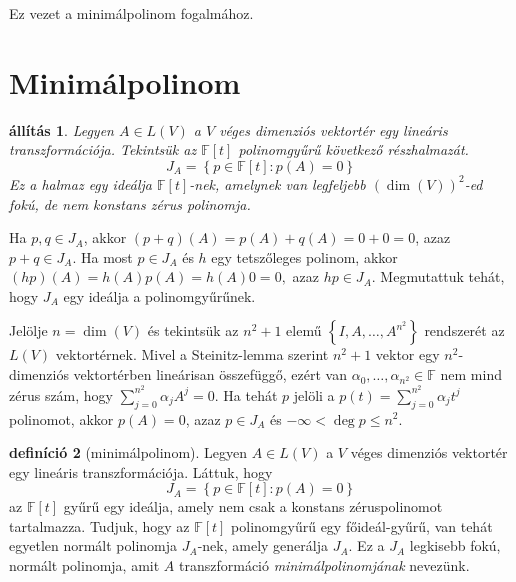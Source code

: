 \documentclass[a4paper, showtrims]{memoir}
\makeatletter
\renewenvironment{proof}[1][\proofname]
    {\par\pushQED{\qed}%
    \normalfont \topsep6\p@\@plus6\p@\relax
    \trivlist
    \item[\hskip\labelsep
        \itshape
    #1\@addpunct{:}]\ignorespaces}
    {\popQED\endtrivlist\@endpefalse}
\theoremstyle{plain}
\newtheorem{proposition}{állítás}[chapter]
\theoremstyle{remark}
\theoremstyle{definition}
\newtheorem{definition}[proposition]{definíció}
\makeatother
\begin{document}
Ez vezet a minimálpolinom fogalmához.

\section{Minimálpolinom}
\begin{proposition}
	Legyen $A\in L\left( V \right)$ a $V$ véges dimenziós vektortér egy lineáris transzformációja.
	Tekintsük az
	$\mathbb{F}\left[ t \right]$ polinomgyűrű következő részhalmazát.
	\[
		J_{A}
		=
		\left\{ p\in\mathbb{F}\left[ t \right]:p\left( A \right)=0 \right\}
	\]
	Ez a halmaz egy ideálja $\mathbb{F}\left[ t \right]$-nek,
	amelynek van legfeljebb $\left( \dim(V) \right)^2$-ed fokú,
	de nem konstans zérus polinomja.
\end{proposition}
\begin{proof}
	Ha $p,q\in J_{A}$,
	akkor
	$\left( p+q \right)(A)=p\left( A \right)+q\left( A \right)=0+0=0$,
	azaz $p+q\in J_{A}$.
	Ha most $p\in J_{A}$ és $h$ egy tetszőleges polinom,
	akkor
	$
		\left( hp \right)(A)=h\left( A \right)p\left( A \right)=h\left( A \right)0=0,
	$
	azaz $hp\in J_{A}$.
	Megmutattuk tehát, hogy $J_{A}$ egy ideálja a polinomgyűrűnek.

	Jelölje $n=\dim(V)$ és tekintsük az $n^2+1$ elemű
	$\left\{ I,A,\ldots,A^{n^2} \right\}$ rendszerét az $L\left( V \right)$ vektortérnek.
	Mivel a Steinitz-lemma szerint 
	$n^2+1$ vektor egy $n^2$-dimenziós vektortérben lineárisan összefüggő,
	ezért van
	$\alpha_0,\ldots,\alpha_{n^2}\in\mathbb{F}$ nem mind zérus szám, hogy
	$\sum_{j=0}^{n^2}\alpha_jA^j=0$.
	Ha tehát $p$ jelöli a $p\left( t \right)=\sum_{j=0}^{n^2}\alpha_jt^j$ polinomot,
	akkor
	$p\left( A \right)=0$, azaz $p\in J_{A}$ és $-\infty<\deg p\leq n^2$.
\end{proof}
\begin{definition}[minimálpolinom]
	Legyen $A\in L\left( V \right)$ a $V$ véges dimenziós vektortér egy lineáris transzformációja.
	Láttuk, hogy
	\[
		J_{A}
		=
		\left\{ p\in\mathbb{F}\left[ t \right]:p\left( A \right)=0 \right\}
	\]
	az $\mathbb{F}\left[ t \right]$ gyűrű egy ideálja, amely nem csak a konstans zéruspolinomot tartalmazza.
	Tudjuk, hogy az $\mathbb{F}\left[ t \right]$ polinomgyűrű egy főideál-gyűrű,
	van tehát egyetlen normált polinomja $J_{A}$-nek, amely generálja $J_{A}$.
	Ez a $J_{A}$ legkisebb fokú, normált polinomja,
	amit $A$ transzformáció \emph{minimálpolinomjának} nevezünk.
\end{definition}
\end{document}
